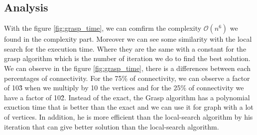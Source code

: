 
\subsection{Analysis}

With the figure \ref{fig:grasp_time}, we can comfirm the complexity $\mathcal{O}(n^6)$ we found in the complexity part.
Moreover we can see some similarity with the local search for the execution time. Where they are the same with a constant for the grasp algorithm 
which is the number of iteration we do to find the best solution.
\bigskip
We can observe in the figure \ref{fig:grasp_time}, there is a differences between each percentages of connectivity.
For the 75\% of connectivity, we can observe a factor of 10\^3 when we multiply by 10 the vertices and for the 25\% of connectivity
we have a factor of 10\^2.
\bigskip
Instead of the exact, the Grasp algorithm has a polynomial exuction time that is better than the exact and we can use it for graph with a lot of vertices.
In addition, he is more efficient than the local-search algorithm by his iteration that can give better solution than the local-search algorithm.